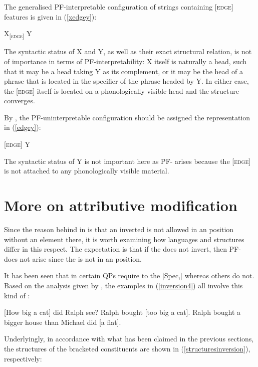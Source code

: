 The generalised PF-interpretable configuration of strings containing [\textsc{edge}] features is given in (\ref{xedgey}):

\ea	X\textsubscript{[\textsc{edge}]} Y \label{xedgey}
\z

The syntactic status of X and Y, as well as their exact structural relation, is not of importance in terms of PF-interpretability: X itself is naturally a head, such that it may be a head taking Y as its complement, or it may be the head of a phrase that is located in the specifier of the phrase headed by Y. In either case, the [\textsc{edge}]  itself is located on a phonologically visible head and the structure converges.

By , the PF-uninterpretable configuration should be assigned the representation in (\ref{edgey}):

\ea	{}[\textsc{edge}] Y \label{edgey}
\z

The syntactic status of Y is not important here as PF- arises because the [\textsc{edge}]  is not attached to any phonologically visible material.

\section{More on attributive modification} \label{sec:4moreonattr}
Since the reason behind  in  is that an inverted  is not allowed in an  position without an  element there, it is worth examining how languages and structures differ in this respect. The expectation is that if the  does not invert, then PF- does not arise since the  is not in an  position.

It has been seen that in  certain QPs require  to the [Spec,] whereas others do not. Based on the analysis given by \citet{kennedymerchant2000}, the examples in (\ref{inversion4}) all involve this kind of :

\ea \label{inversion4}
\ea	{}[How big a cat] did Ralph see? \label{howbigacat}
\ex	Ralph bought [too big a cat]. \label{inversiontoobigacat}
\ex	Ralph bought a bigger house than Michael did [a flat].
\z
\z

Underlyingly, in accordance with what has been claimed in the previous sections, the structures of the bracketed constituents are shown in (\ref{structuresinversion}), respectively:

